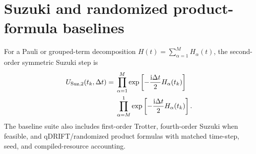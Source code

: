 \documentclass[
  reprint,
  amsmath,
  amssymb,
  aps,
  pra,
  nofootinbib,
  superscriptaddress,
  floatfix
]{revtex4-2}
\newcommand{\ii}{\mathrm{i}}
\begin{document}
\section{Suzuki and randomized product-formula baselines}
\label{app:product_formula}

For a Pauli or grouped-term decomposition $H(t)=\sum_{\alpha=1}^{M}H_{\alpha}(t)$, the second-order symmetric Suzuki step is
\begin{equation}
\begin{split}
U_{{\rm Suz},2}(t_k,\Delta t)={}&\prod_{\alpha=1}^{M}\exp\left[-\frac{\ii\Delta t}{2}H_{\alpha}(t_k)\right]\\
&\prod_{\alpha=M}^{1}\exp\left[-\frac{\ii\Delta t}{2}H_{\alpha}(t_k)\right].
\end{split}
\label{eq:suzuki2_generic}
\end{equation}
The baseline suite also includes first-order Trotter, fourth-order Suzuki when feasible, and qDRIFT/randomized product formulas with matched time-step, seed, and compiled-resource accounting.
\end{document}
